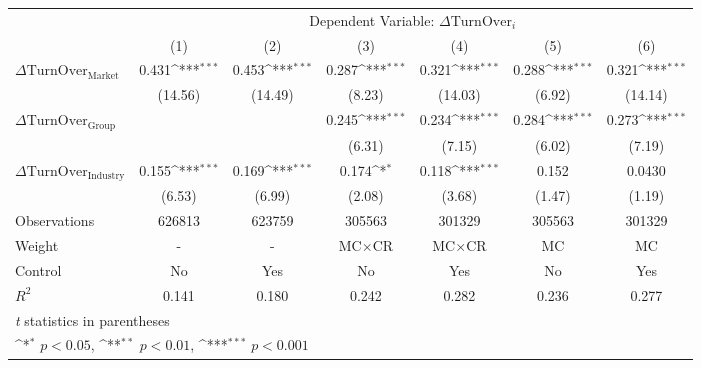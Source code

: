 {
\def\sym#1{\ifmmode^{#1}\else\(^{#1}\)\fi}
\begin{tabular}{l*{6}{c}}
\hline\hline
                    &\multicolumn{6}{c}{Dependent Variable: $\Delta \text{TurnOver}_{i} $ }                                                             \\\cmidrule(lr){2-7}
                    &\multicolumn{1}{c}{(1)}         &\multicolumn{1}{c}{(2)}         &\multicolumn{1}{c}{(3)}         &\multicolumn{1}{c}{(4)}         &\multicolumn{1}{c}{(5)}         &\multicolumn{1}{c}{(6)}         \\
\hline
 $ \Delta \text{TurnOver}_{\text{Market}} $ &       0.431\sym{***}&       0.453\sym{***}&       0.287\sym{***}&       0.321\sym{***}&       0.288\sym{***}&       0.321\sym{***}\\
                    &     (14.56)         &     (14.49)         &      (8.23)         &     (14.03)         &      (6.92)         &     (14.14)         \\
[1em]
 $ \Delta \text{TurnOver}_{\text{Group}} $ &                     &                     &       0.245\sym{***}&       0.234\sym{***}&       0.284\sym{***}&       0.273\sym{***}\\
                    &                     &                     &      (6.31)         &      (7.15)         &      (6.02)         &      (7.19)         \\
[1em]
 $ \Delta \text{TurnOver}_{\text{Industry}} $ &       0.155\sym{***}&       0.169\sym{***}&       0.174\sym{*}  &       0.118\sym{***}&       0.152         &      0.0430         \\
                    &      (6.53)         &      (6.99)         &      (2.08)         &      (3.68)         &      (1.47)         &      (1.19)         \\
\hline
Observations        &      626813         &      623759         &      305563         &      301329         &      305563         &      301329         \\
Weight              &           -         &           -         & $ \text{MC} \times \text{CR} $          & $ \text{MC} \times \text{CR} $          & $ \text{MC} $          & $ \text{MC} $          \\
Control             &          No         &         Yes         &          No         &         Yes         &          No         &         Yes         \\
$ R^2 $             &       0.141         &       0.180         &       0.242         &       0.282         &       0.236         &       0.277         \\
\hline\hline
\multicolumn{7}{l}{\footnotesize \textit{t} statistics in parentheses}\\
\multicolumn{7}{l}{\footnotesize \sym{*} \(p<0.05\), \sym{**} \(p<0.01\), \sym{***} \(p<0.001\)}\\
\end{tabular}
}
